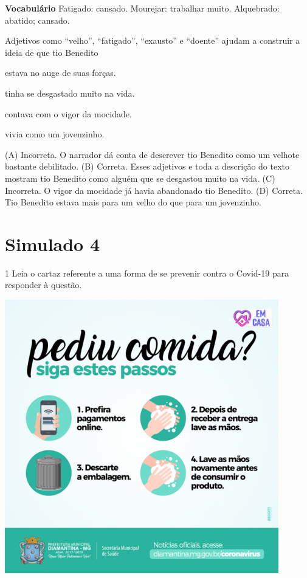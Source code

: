 \textbf{Vocabulário}
Fatigado: cansado.
Mourejar: trabalhar muito.
Alquebrado: abatido; cansado.

Adjetivos como ``velho'', ``fatigado'', ``exausto'' e ``doente'' ajudam a construir a ideia de que tio Benedito

\begin{escolha}
\item estava no auge de suas forças.

\item tinha se desgastado muito na vida.

\item contava com o vigor da mocidade.

\item vivia como um jovenzinho.
\end{escolha}


(A) Incorreta. O narrador dá conta de descrever tio Benedito como um velhote bastante debilitado.
(B) Correta. Esses adjetivos e toda a descrição do texto mostram tio Benedito como alguém que se desgastou muito na vida.
(C) Incorreta. O vigor da mocidade já havia abandonado tio Benedito.
(D) Correta. Tio Benedito estava mais para um velho do que para um jovenzinho.

\chapter{Simulado 4}

\num{1} Leia o cartaz referente a uma forma de se prevenir contra o Covid-19
para responder à questão.


\includegraphics[width=4.68750in,height=4.68750in]{./media/image36.png}

